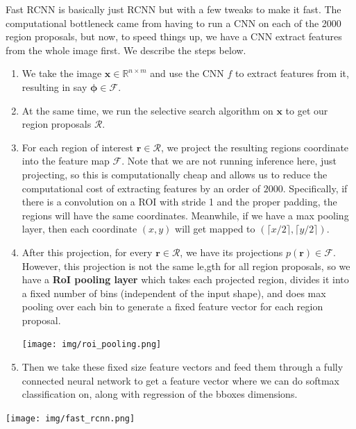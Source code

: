 \documentclass{article}
\theoremstyle{definition}
\theoremstyle{remark}
\theoremstyle{definition}
\begin{document}
    Fast RCNN is basically just RCNN but with a few tweaks to make it fast. The computational bottleneck came from having to run a CNN on each of the 2000 region proposals, but now, to speed things up, we have a CNN extract features from the whole image first. We describe the steps below. 
    \begin{enumerate} 
        \item We take the image $\mathbf{x} \in \mathbb{R}^{n \times m}$ and use the CNN $f$ to extract features from it, resulting in say $\boldsymbol{\phi} \in \mathcal{F}$.
        \item At the same time, we run the selective search algorithm on $\mathbf{x}$ to get our region proposals $\mathcal{R}$. 
        \item For each region of interest $\mathbf{r} \in \mathcal{R}$, we project the resulting regions coordinate into the feature map $\mathcal{F}$. Note that we are not running inference here, just projecting, so this is computationally cheap and allows us to reduce the computational cost of extracting features by an order of $2000$. Specifically, if there is a convolution on a ROI with stride 1 and the proper padding, the regions will have the same coordinates. Meanwhile, if we have a max pooling layer, then each coordinate $(x, y)$ will get mapped to $(\lceil x/2 \rceil, \lceil y/2 \rceil)$. 
        \item After this projection, for every $\mathbf{r} \in \mathcal{R}$, we have its projections $p(\mathbf{r}) \in \mathcal{F}$. However, this projection is not the same le,gth for all region proposals, so we have a \textbf{RoI pooling layer} which takes each projected region, divides it into a fixed number of bins (independent of the input shape), and does max pooling over each bin to generate a fixed feature vector for each region proposal.
        \begin{center}
            \texttt{[image: img/roi\_pooling.png]} 
        \end{center}
        \item Then we take these fixed size feature vectors and feed them through a fully connected neural network to get a feature vector where we can do softmax classification on, along with regression of the bboxes dimensions. 
    \end{enumerate}

    \begin{center}
        \texttt{[image: img/fast\_rcnn.png]}
    \end{center}
\end{document}
